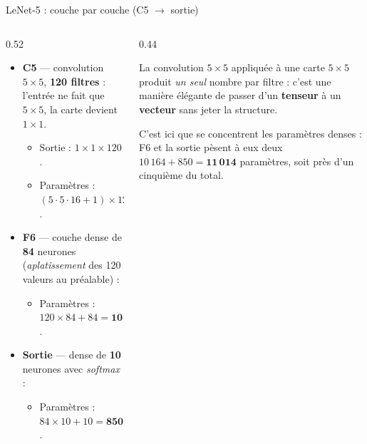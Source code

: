 \begin{frame}{LeNet-5 : couche par couche (C5 $\rightarrow$ sortie)}
\begin{columns}[t]
\begin{column}{0.52\textwidth}
\begin{itemize}
  \item \textbf{C5} --- convolution $5\times5$, \textbf{120 filtres} :
  l'entrée ne fait que $5\times5$, la carte devient $1\times1$.
  \begin{itemize}
    \item Sortie : $1 \times 1 \times 120$.
    \item Paramètres : $(5\cdot 5\cdot 16 + 1)\times 120 = \mathbf{48\,120}$.
  \end{itemize}
  \item \textbf{F6} --- couche dense de \textbf{84} neurones
  (\emph{aplatissement} des 120 valeurs au préalable) :
  \begin{itemize}
    \item Paramètres : $120 \times 84 + 84 = \mathbf{10\,164}$.
  \end{itemize}
  \item \textbf{Sortie} --- dense de \textbf{10} neurones avec \emph{softmax} :
  \begin{itemize}
    \item Paramètres : $84 \times 10 + 10 = \mathbf{850}$.
  \end{itemize}
\end{itemize}
\end{column}
\begin{column}{0.44\textwidth}
\begin{ebox}
La convolution $5\times5$ appliquée à une carte $5\times5$ produit
\emph{un seul} nombre par filtre : c'est une manière élégante de passer
d'un \textbf{tenseur} à un \textbf{vecteur} sans jeter la structure.
\end{ebox}
\begin{wbox}
C'est ici que se concentrent les paramètres denses : F6 et la sortie
pèsent à eux deux $10\,164 + 850 = \mathbf{11\,014}$ paramètres,
soit près d'un cinquième du total.
\end{wbox}
\end{column}
\end{columns}
\end{frame}

